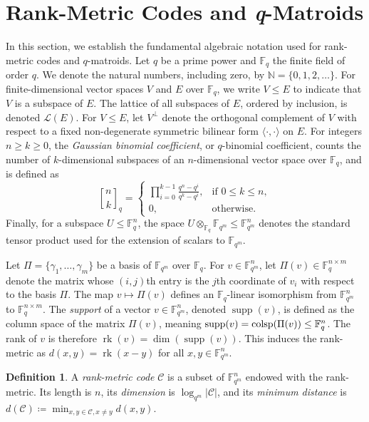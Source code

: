 \documentclass[a4paper,11pt,reqno]{article}
\newcommand{\F}{\mathbb{F}}
\newcommand{\rk}{\operatorname{rk}}
\newcommand{\supp}{\operatorname{supp}}
\newcommand{\C}{\mathcal{C}}
\newcommand{\qbinom}[2]{\genfrac[]{0pt}{0}{#1}{#2}}
\theoremstyle{plain} \numberwithin{equation}{section}
\theoremstyle{definition}
\newtheorem{definition}[theorem]{Definition}
\begin{document}
\section{Rank-Metric Codes and \textit{q}-Matroids} \label{sec:rankmetriccodes}
In this section, we establish the fundamental algebraic notation used for rank-metric codes and $q$-matroids. Let $q$ be a prime power and $\mathbb{F}_q$ the finite field of order $q$. We denote the natural numbers, including zero, by $\mathbb{N} = \{0,1,2,\ldots\}$. For finite-dimensional vector spaces $V$ and $E$ over $\mathbb{F}_q$, we write $V \leq E$ to indicate that $V$ is a subspace of $E$. The lattice of all subspaces of $E$, ordered by inclusion, is denoted $\mathcal{L}(E)$. For $V\leq E$, let $V^\perp$ denote the orthogonal complement of $V$ with respect to a fixed non-degenerate symmetric bilinear form $\langle\cdot,\cdot\rangle$ on $E$. For integers $n\geq k\geq 0$, the \emph{Gaussian binomial coefficient}, or $q$-binomial coefficient, counts the number of $k$-dimensional subspaces of an $n$-dimensional vector space over $\F_q$, and is defined as
\[
    \qbinom{n}{k}_q = \begin{cases}
        \prod^{k-1}_{i=0} \frac{q^n-q^i}{q^k-q^i}, & \text{if } 0\leq k \leq n, \\
        0, & \text{otherwise.}
    \end{cases}
\]
Finally, for a subspace $U \le \mathbb{F}_q^n$, the space $U \otimes_{\mathbb{F}_q}\mathbb{F}_{q^m}\leq \F_{q^m}^n$ denotes the standard tensor product used for the extension of scalars to $\mathbb{F}_{q^m}$.


Let $\Pi = \{\gamma_1, \ldots, \gamma_m\}$ be a basis of $\mathbb{F}_{q^m}$ over $\mathbb{F}_q$. For $v \in \mathbb{F}_{q^m}^n$, let $\Pi(v) \in \mathbb{F}_q^{n \times m}$ denote the matrix whose $(i, j)$th entry is the $j$th coordinate of $v_i$ with respect to the basis $\Pi$. The map $v \mapsto \Pi(v)$ defines an $\mathbb{F}_q$-linear isomorphism from $\mathbb{F}_{q^m}^n$ to $\mathbb{F}_q^{n \times m}$. The \emph{support} of a vector $v \in \mathbb{F}_{q^m}^n$, denoted $\supp(v)$, is defined as the column space of the matrix $\Pi(v)$, meaning $\supp(v) = \textup{colsp}(\Pi(v)) \leq \mathbb{F}_q^n$. The rank of $v$ is therefore $\rk(v) = \dim(\supp(v))$. This induces the rank-metric as $d(x,y) = \rk(x-y)$ for all $x,y\in \F_{q^m}^n$.

\begin{definition}
A \emph{rank-metric code} $\C$ is a subset of $\F_{q^m}^n$ endowed with the rank-metric. Its length is $n$, its \emph{dimension} is $\log_{q^m} |\C|$, and its \emph{minimum distance} is $d(\C)\coloneqq \min_{x,y\in \C, x\neq y} d(x,y)$.
\end{definition}
\end{document}
